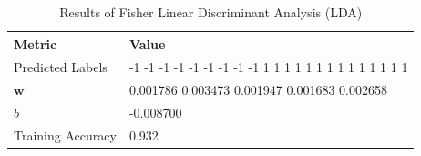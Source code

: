 \begin{table}[H]
\centering
\caption{Results of Fisher Linear Discriminant Analysis (LDA)}
\begin{tabular}{ll}
\toprule
Metric & Value \\
\midrule
Predicted Labels & -1 -1 -1 -1 -1 -1 -1 -1 -1 1 1 1 1 1 1 1 1 1 1 1 1 1 1 \\
$\mathbf{w}$ & 0.001786 0.003473 0.001947 0.001683 0.002658 \\
$b$ & -0.008700 \\
Training Accuracy & 0.932 \\
\bottomrule
\end{tabular}
\end{table}
